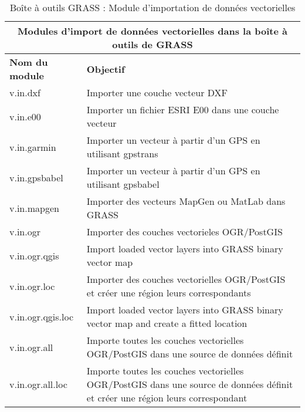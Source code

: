 \begin{table}[H]
\centering
 \begin{tabular}{|p{2.5cm}|p{11.5cm}|}
  \hline \multicolumn{2}{|c|}{\textbf{Modules d'import de données vectorielles dans la boîte à outils de GRASS}} \\ 
  \hline \textbf{Nom du module} & \textbf{Objectif} \\
  \hline v.in.dxf & Importer une couche vecteur DXF \\
  \hline v.in.e00 & Importer un fichier ESRI E00 dans une couche vecteur \\
  \hline v.in.garmin & Importer un vecteur à partir d'un GPS en utilisant gpstrans \\
  \hline v.in.gpsbabel & Importer un vecteur à partir d'un GPS en utilisant gpsbabel \\
  \hline v.in.mapgen & Importer des vecteurs MapGen ou MatLab dans GRASS \\
  \hline v.in.ogr & Importer des couches vectorieles OGR/PostGIS \\
  \hline v.in.ogr.qgis & Import loaded vector layers into GRASS binary
  vector map \\
  \hline v.in.ogr.loc & Importer des couches vectorielles OGR/PostGIS et créer une région leurs correspondants\\
  \hline v.in.ogr.qgis.loc & Import loaded vector layers into GRASS binary
  vector map and create a fitted location \\
  \hline v.in.ogr.all & Importe toutes les couches vectorielles OGR/PostGIS dans une source de données définit \\
  \hline v.in.ogr.all.loc & Importe toutes les couches vectorielles OGR/PostGIS dans une source de données définit et créer une région leurs correspondant\\
\hline
\end{tabular}
\caption{Boîte à outils GRASS : Module d'importation de données vectorielles}
\end{table}


